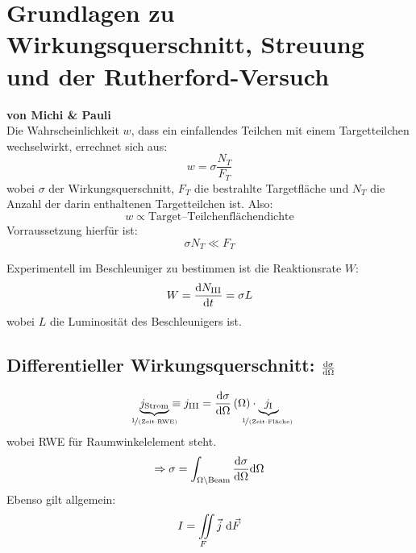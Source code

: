 \documentclass[Ex4_Zusammenfassung.tex]{subfiles}
\begin{document}
\section{Grundlagen zu Wirkungsquerschnitt, Streuung und der Rutherford-Versuch}
\textbf{von Michi \& Pauli}\\

Die Wahrscheinlichkeit $w$, dass ein einfallendes Teilchen mit einem Targetteilchen wechselwirkt, errechnet sich aus:
\begin{equation}
	w = \sigma \frac{N_T}{F_T}
\end{equation}
wobei $\sigma$ der Wirkungsquerschnitt,  $F_T$ die bestrahlte Targetfläche und $N_T$ die Anzahl der darin enthaltenen Targetteilchen ist. Also:
\begin{equation*}
	w \propto \text{Target--Teilchenflächendichte}
\end{equation*}
Vorraussetzung hierfür ist:
\begin{equation*}
	\sigma N_T \ll F_T
\end{equation*}

Experimentell im Beschleuniger zu bestimmen ist die Reaktionsrate $W$: 
\begin{equation}
	W = \frac{\md N_{\text{\rom{3}}}}{\md t} = \sigma L
\end{equation}
wobei $L$ die Luminosität des Beschleunigers ist.\\

\subsection{Differentieller Wirkungsquerschnitt: $\frac{\mathrm{d} \sigma}{\mathrm{d} \Omega}$}
\begin{equation}
	\underbrace{j_{\text{Strom}}}_{\mathclap{\nicefrac{1}{\text{(Zeit$\cdot$RWE)} }} } \equiv j_{\text{\rom{3}}} = \derive{\sigma}{\Omega} \lp \Omega \rp \cdot \underbrace{j_{\text{\rom{1}}}}_{\mathclap{\nicefrac{1}{\text{(Zeit$\cdot$Fläche) }} } } 
\end{equation}
wobei RWE für Raumwinkelelement steht. 
\begin{equation}
	\Rightarrow \sigma = \int_{\Omega \setminus \text{Beam} }\frac{\mathrm{d} \sigma}{\mathrm{d} \Omega} \mathrm{d} \Omega
\end{equation}
Ebenso gilt allgemein:
\begin{equation}
	I = \mathop{\int \kern -0.7em \int}_{\kern -0.6em F} \vec{j}\ \mathrm{d} \vec{F}
\end{equation}
\end{document}
